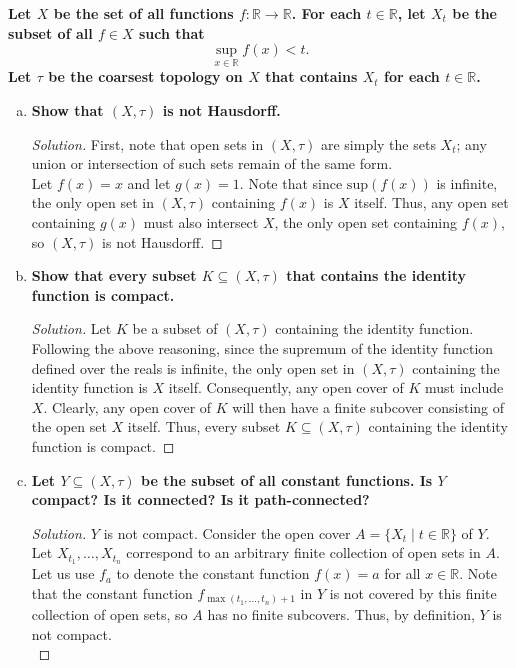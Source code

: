 \documentclass[11pt]{article}
\newcommand{\R}{\mathbb{R}}
\newenvironment{solution}
  {\renewcommand\qedsymbol{$\blacksquare$}\begin{proof}[Solution]}
  {\end{proof}}
\begin{document}
\textbf{Let $X$ be the set of all functions $f\colon \R \rightarrow \R$. For each $t \in \R$, let $X_t$ be the subset of all $f \in X$ such that}
\[
    \sup\limits_{x \in \R} f(x) < t.
\]
\textbf{Let $\tau$ be the coarsest topology on $X$ that contains $X_t$ for each $t \in \R$.}
\begin{enumerate}[a)]
    \item \textbf{Show that $(X, \tau)$ is not Hausdorff.}
    \begin{solution}
    First, note that open sets in $(X, \tau)$ are simply the sets $X_t$; any union or intersection of such sets remain of the same form. \\

    Let $f(x) = x$ and let $g(x) = 1$. Note that since $\mathrm{sup}(f(x))$ is infinite, the only open set in $(X, \tau)$ containing $f(x)$ is $X$ itself. Thus, any open set containing $g(x)$ must also intersect $X$,
    the only open set containing $f(x)$, so $(X, \tau)$ is not Hausdorff.
    \end{solution}

    \item \textbf{Show that every subset $K \subseteq (X, \tau)$ that contains the identity function is compact.}
    
    \begin{solution}
    Let $K$ be a subset of $(X, \tau)$ containing the identity function. Following the above reasoning, since the supremum of the identity function defined over the reals is infinite, the only open set in $(X, \tau)$ containing
    the identity function is $X$ itself. Consequently, any open cover of $K$ must include $X$. Clearly, any open cover of $K$ will then have a finite subcover consisting of the open set $X$ itself.
    Thus, every subset $K \subseteq (X, \tau)$ containing the identity function is compact.
    \end{solution}

    \item \textbf{Let $Y \subseteq (X, \tau)$ be the subset of all constant functions. Is $Y$ compact? Is it connected? Is it path-connected?}
    
    \begin{solution}
    $Y$ is not compact. Consider the open cover $A = \{ X_t \mid t \in \R \}$ of $Y$. Let $X_{t_1}, \dots, X_{t_n}$ correspond to an arbitrary finite collection of open sets in $A$. Let us use $f_a$ to denote the constant function $f(x) = a$ for all $x \in \R$.
    Note that the constant function $f_{\max(t_1, \dots, t_n) + 1}$ in $Y$ is not covered by this finite collection of open sets, so $A$ has no finite subcovers. Thus, by definition, $Y$ is not compact. \\


\end{solution}
\end{enumerate}
\end{document}

